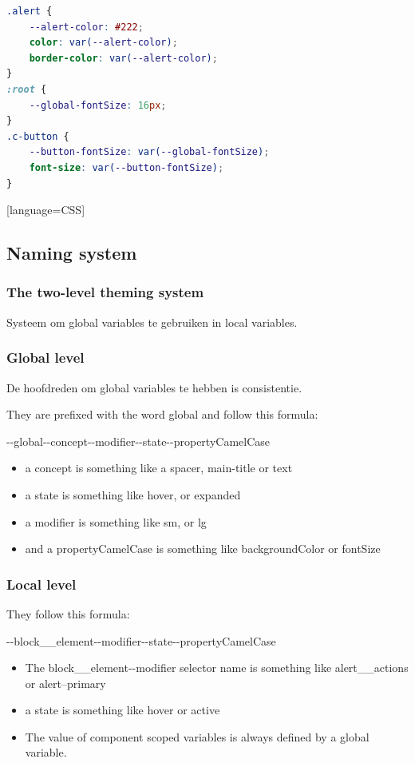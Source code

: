 \documentclass{article}
\begin{document}
\begin{lstlisting}[language=CSS]
.alert {
    --alert-color: #222;
    color: var(--alert-color);
    border-color: var(--alert-color);
}
:root {
    --global-fontSize: 16px;
}
.c-button {
    --button-fontSize: var(--global-fontSize);
    font-size: var(--button-fontSize);
}
\end{lstlisting}[language=CSS]


\subsection{Naming system}

\subsubsection{The two-level theming system}

Systeem om global variables te gebruiken in local variables.

\subsubsection{Global level}

De hoofdreden om global variables te hebben is consistentie.

They are prefixed with the word global and follow this formula:

-{}-global-{}-concept-{}-modifier-{}-state-{}-propertyCamelCase

\begin{itemize}
    \item a concept is something like a spacer, main-title or text
    \item a state is something like hover, or expanded
    \item a modifier is something like sm, or lg
    \item and a propertyCamelCase is something like backgroundColor or fontSize
\end{itemize}

\subsubsection{Local level}

They follow this formula: 

-{}-block\_\_element-{}-modifier-{}-state-{}-propertyCamelCase

\begin{itemize}
    \item The block\_\_element-{}-modifier selector name is something like alert\_\_actions or alert--primary
    \item a state is something like hover or active
    \item The value of component scoped variables is always defined by a global variable.
\end{itemize}
\end{document}
